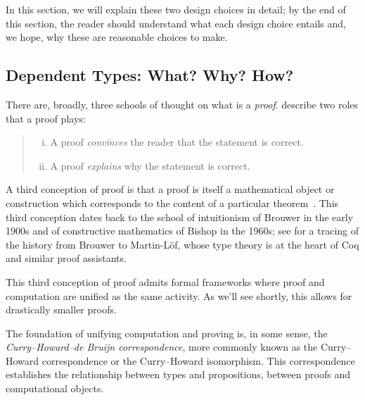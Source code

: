In this section, we will explain these two design choices in detail;
by the end of this section, the reader should understand what each design choice entails and, we hope, why these are reasonable choices to make.


\subsection{Dependent Types: What? Why? How?}\label{sec:why-how-dependent-types}
There are, broadly, three schools of thought on what is a \emph{proof}.
\textcite{Proof2009Geuvers} describe two roles that a proof plays:
\begin{quote}
\begin{enumerate}[(i)]
\item A proof \emph{convinces} the reader that the statement is correct.
\item A proof \emph{explains} why the statement is correct.
\end{enumerate}
\end{quote}
A third conception of proof is that a proof is itself a mathematical object or construction which corresponds to the content of a particular theorem~\cite{Rigour2013Bauer}.
This third conception dates back to the school of intuitionism of Brouwer in the early 1900s and of constructive mathematics of Bishop in the 1960s; see \textcite[Related Works]{nuprl} for a tracing of the history from Brouwer to Martin-L\"of, whose type theory is at the heart of Coq and similar proof assistants.


This third conception of proof admits formal frameworks where proof and computation are unified as the same activity.
As we'll see shortly, this allows for drastically smaller proofs.

The foundation of unifying computation and proving is, in some sense, the \emph{Curry--Howard--de Bruijn correspondence}, more commonly known as the Curry--Howard correspondence or the Curry--Howard isomorphism.
This correspondence establishes the relationship between types and propositions, between proofs and computational objects.

